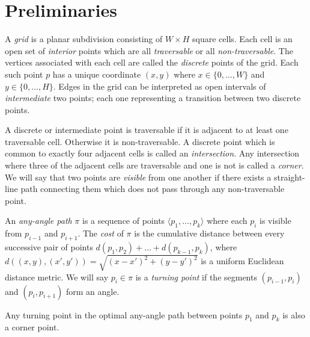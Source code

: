 \section{Preliminaries}
A \emph{grid} is a planar subdivision consisting of $W \times H$ square cells.
Each cell is an open set of \emph{interior} points which are 
all \emph{traversable} or all \emph{non-traversable}.
The vertices associated with each cell are called the
\emph{discrete} points of the grid. Each such point $p$ has a unique coordinate $(x, y)$
where $x \in \{0,\dots,W\}$ and $y \in \{0,\dots,H\}$.
Edges in the grid can be interpreted as open intervals of \emph{intermediate}
two points; each one representing a transition between two discrete points. 
\par
A discrete or intermediate point is traversable if it is adjacent to 
at least one traversable cell. Otherwise it is non-traversable.
A discrete point which is common to exactly four adjacent cells is called an \emph{intersection}.
Any intersection where three of the adjacent cells are traversable and one is not
is called a \emph{corner}.
We will say that two points are \emph{visible} from one another if there exists a 
straight-line path connecting them which does not pass through any non-traversable point.

An \emph{any-angle path} $\pi$ is a sequence of points 
$\langle p_1,\dots,p_k \rangle$ where each $p_{i}$ is visible from $p_{i-1}$
and $p_{i+1}$.
The \emph{cost} of $\pi$ 
is the cumulative distance between every successive
pair of points $d(p_1,p_2) + \dots + d(p_{k-1},p_k)$, 
where $d((x,y), (x',y'))= \sqrt{(x-x')^2 + (y-y')^2}$ 
is a uniform Euclidean distance metric.
We will say $p_i \in \pi$ is a \emph{turning point} if the segments
$(p_{i-1}, p_i)$ and $(p_i, p_{i+1})$ form an angle.
\\
\begin{lemma}
\label{lemma::anya::corner}
  Any turning point in the optimal any-angle path between points $p_1$ and 
$p_k$ is also a corner point.
\end{lemma}


